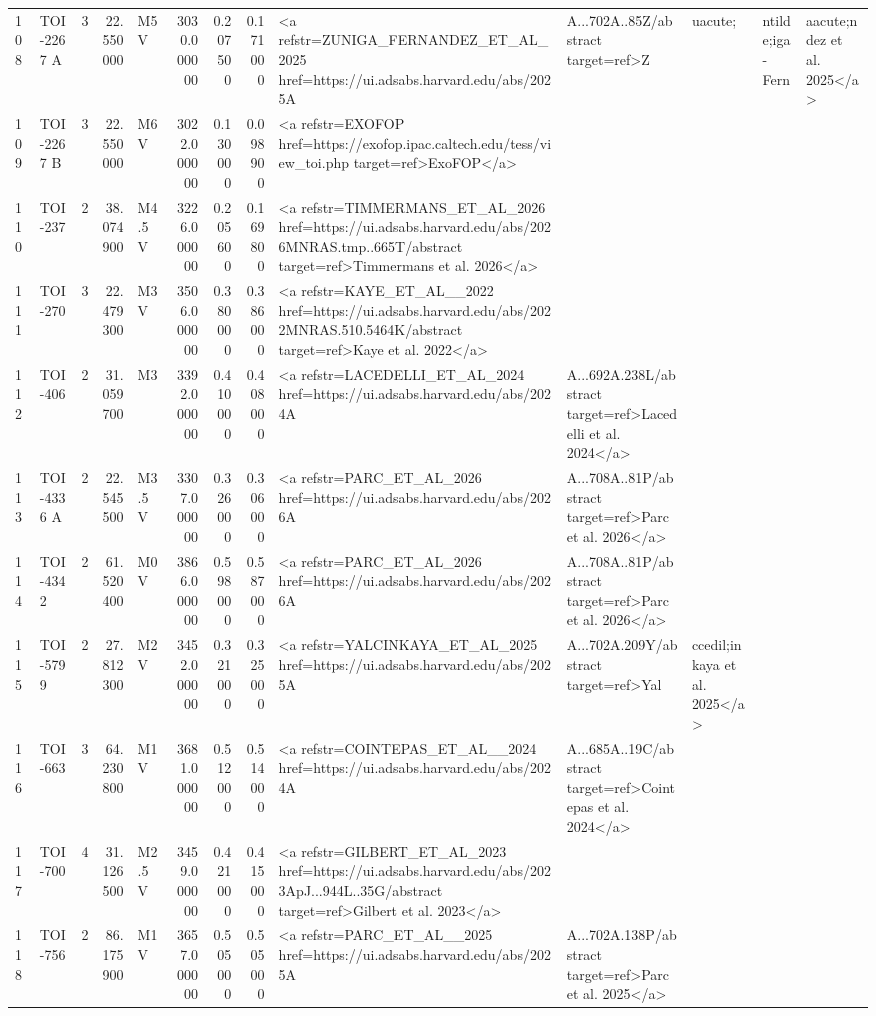 \begin{tabular}{llrrlrrrl}
108 & TOI-2267 A & 3 & 22.550000 & M5 V & 3030.000000 & 0.207500 & 0.171000 & <a refstr=ZUNIGA_FERNANDEZ_ET_AL_2025 href=https://ui.adsabs.harvard.edu/abs/2025A&A...702A..85Z/abstract target=ref>Z&uacute;&ntilde;iga-Fern&aacute;ndez et al. 2025</a> \\
109 & TOI-2267 B & 3 & 22.550000 & M6 V & 3022.000000 & 0.130000 & 0.098900 & <a refstr=EXOFOP href=https://exofop.ipac.caltech.edu/tess/view_toi.php target=ref>ExoFOP</a> \\
110 & TOI-237 & 2 & 38.074900 & M4.5 V & 3226.000000 & 0.205600 & 0.169800 & <a refstr=TIMMERMANS_ET_AL_2026 href=https://ui.adsabs.harvard.edu/abs/2026MNRAS.tmp..665T/abstract target=ref>Timmermans et al. 2026</a> \\
111 & TOI-270 & 3 & 22.479300 & M3 V & 3506.000000 & 0.380000 & 0.386000 & <a refstr=KAYE_ET_AL__2022 href=https://ui.adsabs.harvard.edu/abs/2022MNRAS.510.5464K/abstract target=ref>Kaye et al. 2022</a> \\
112 & TOI-406 & 2 & 31.059700 & M3 & 3392.000000 & 0.410000 & 0.408000 & <a refstr=LACEDELLI_ET_AL_2024 href=https://ui.adsabs.harvard.edu/abs/2024A&A...692A.238L/abstract target=ref>Lacedelli et al. 2024</a> \\
113 & TOI-4336 A & 2 & 22.545500 & M3.5 V & 3307.000000 & 0.326000 & 0.306000 & <a refstr=PARC_ET_AL_2026 href=https://ui.adsabs.harvard.edu/abs/2026A&A...708A..81P/abstract target=ref>Parc et al. 2026</a> \\
114 & TOI-4342 & 2 & 61.520400 & M0 V & 3866.000000 & 0.598000 & 0.587000 & <a refstr=PARC_ET_AL_2026 href=https://ui.adsabs.harvard.edu/abs/2026A&A...708A..81P/abstract target=ref>Parc et al. 2026</a> \\
115 & TOI-5799 & 2 & 27.812300 & M2 V & 3452.000000 & 0.321000 & 0.325000 & <a refstr=YALCINKAYA_ET_AL_2025 href=https://ui.adsabs.harvard.edu/abs/2025A&A...702A.209Y/abstract target=ref>Yal&ccedil;inkaya et al. 2025</a> \\
116 & TOI-663 & 3 & 64.230800 & M1 V & 3681.000000 & 0.512000 & 0.514000 & <a refstr=COINTEPAS_ET_AL__2024 href=https://ui.adsabs.harvard.edu/abs/2024A&A...685A..19C/abstract target=ref>Cointepas et al. 2024</a> \\
117 & TOI-700 & 4 & 31.126500 & M2.5 V & 3459.000000 & 0.421000 & 0.415000 & <a refstr=GILBERT_ET_AL_2023 href=https://ui.adsabs.harvard.edu/abs/2023ApJ...944L..35G/abstract target=ref>Gilbert et al. 2023</a> \\
118 & TOI-756 & 2 & 86.175900 & M1 V & 3657.000000 & 0.505000 & 0.505000 & <a refstr=PARC_ET_AL__2025 href=https://ui.adsabs.harvard.edu/abs/2025A&A...702A.138P/abstract target=ref>Parc et al. 2025</a> \\

\end{tabular}
